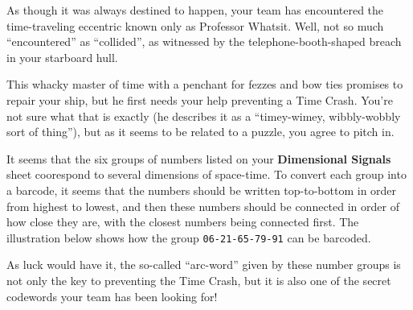 As though it was always destined to happen, your team has encountered
the time-traveling eccentric known only as Professor Whatsit. Well, not
so much ``encountered'' as ``collided'', as witnessed by the 
telephone-booth-shaped breach in your starboard hull.

This whacky master of time with a penchant for fezzes and bow ties promises to
repair your ship, but he first needs your help preventing a
Time Crash. You're not sure what that is exactly (he describes it as a
``timey-wimey, wibbly-wobbly sort of thing''), but as it seems to be 
related to a puzzle, you agree to pitch in.

It seems that the six groups of numbers listed on your
\textbf{Dimensional Signals} sheet coorespond to several dimensions
of space-time. To convert each group into a barcode, it seems that
the numbers should be written top-to-bottom in order from highest to lowest, 
and then these numbers should
be connected in order of how close they are, with the closest numbers
being connected first. The illustration below shows how the group
\texttt{06-21-65-79-91} can be barcoded.

As luck would have it, the so-called ``arc-word'' given by
these number groups is not only the key to preventing the Time Crash,
but it is also one of the secret codewords your team has been looking
for!

\begin{center}
\end{center} 
